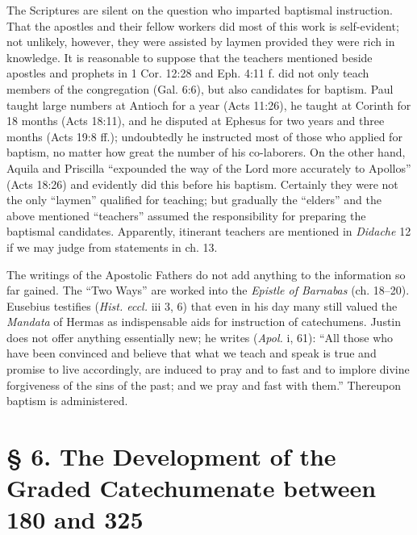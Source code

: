The Scriptures are silent on the question who imparted baptismal instruction. That the apostles and their fellow workers did most of this work is self-evident; not unlikely, however, they were assisted by laymen provided they were rich in knowledge. It is reasonable to suppose that the teachers mentioned beside apostles and prophets in 1 Cor. 12:28 and Eph. 4:11 f. did not only teach members of the congregation (Gal. 6:6), but also candidates for baptism. Paul taught large numbers at Antioch for a year (Acts 11:26), he taught at Corinth for 18 months (Acts 18:11), and he disputed at Ephesus for two years and three months (Acts 19:8 ff.); undoubtedly he instructed most of those who applied for baptism, no matter how great the number of his co-laborers. On the other hand, Aquila and Priscilla “expounded the way of the Lord more accurately to Apollos” (Acts 18:26) and evidently did this before his baptism. Certainly they were not the only “laymen” qualified for teaching; but gradually the “elders” and the above mentioned “teachers” assumed the responsibility for preparing the baptismal candidates. Apparently, itinerant teachers are mentioned in \emph{Didache} 12 if we may judge from statements in ch. 13.

The writings of the Apostolic Fathers do not add anything to the information so far gained. The “Two Ways” are worked into the \emph{Epistle of Barnabas} (ch. 18–20). Eusebius testifies (\emph{Hist. eccl.} iii 3, 6) that even in his day many still valued the \emph{Mandata} of Hermas as indispensable aids for instruction of catechumens. Justin does not offer anything essentially new; he writes (\emph{Apol.} i, 61): “All those who have
been convinced and believe that what we teach and speak is true and promise to live accordingly, are induced to pray and to fast and to implore divine forgiveness of the sins of the past; and we pray and fast with them.” Thereupon baptism is administered.

\section[§ 6. The Graded Catechumenate]{§ 6. The Development of the Graded Catechumenate between 180 and 325}


